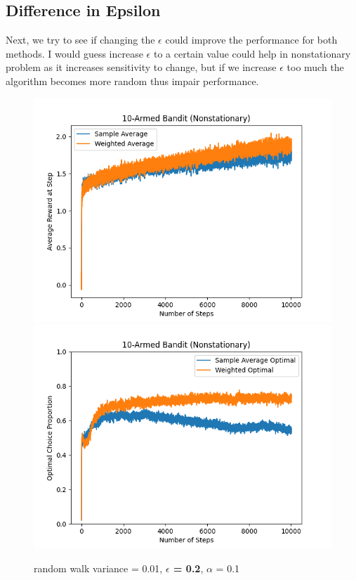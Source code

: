 \documentclass{article}
\begin{document}
\subsection{Difference in Epsilon}
Next, we try to see if changing the $\epsilon$ could improve the performance for both methods. I would guess increase $\epsilon$ to a certain value could help in nonstationary problem as it increases sensitivity to change, but if we increase $\epsilon$ too much the algorithm becomes more random thus impair performance.

\begin{figure}[h!]
\centering
\includegraphics[scale=.6]{RL_A1_pics/epsilon/0.2.png}
\includegraphics[scale=.6]{RL_A1_pics/epsilon/optimal/0.2.png}
\caption{random walk variance = 0.01, \textbf{$\epsilon$ = 0.2}, $\alpha$ = 0.1}
\label{fig:10-Armed1}
\end{figure}
\end{document}
